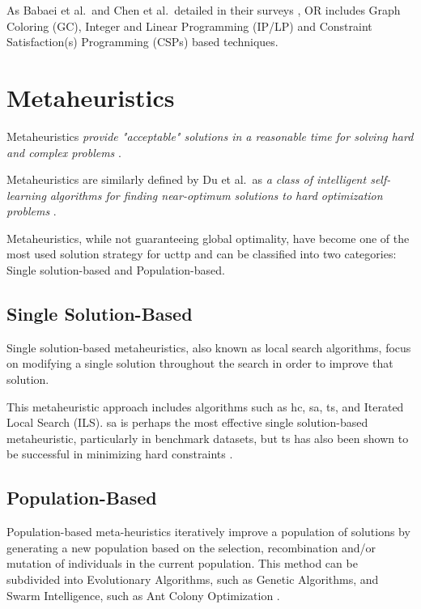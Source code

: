 As Babaei et al.\ and Chen et al.\ detailed in their surveys \cite{babaei_survey_2015,chen_survey_2021}, OR includes Graph Coloring (GC), Integer and Linear Programming (IP/LP) and Constraint Satisfaction(s) Programming (CSPs) based techniques.

\section{Metaheuristics}

Metaheuristics \textit{provide "acceptable" solutions in a reasonable time for solving hard and complex problems} \cite{talbi2009metaheuristics}. 

Metaheuristics are similarly defined by Du et al.\ as \textit{a class of intelligent self-learning algorithms for finding near-optimum solutions to hard optimization problems} \cite{du2016search}.

Metaheuristics, while not guaranteeing global optimality, have become one of the most used solution strategy for \ac{ucttp} and can be classified into two categories: Single solution-based and Population-based.

\subsection{Single Solution-Based}

Single solution-based metaheuristics, also known as local search algorithms, focus on modifying a single solution throughout the search in order to improve that solution. 

This metaheuristic approach includes algorithms such as \ac{hc}, \ac{sa}, \ac{ts}, and Iterated Local Search (ILS). \ac{sa} is perhaps the most effective single solution-based metaheuristic, particularly in benchmark datasets, but \ac{ts} has also been shown to be successful in minimizing hard constraints \cite{abdipoor_meta-heuristic_2023}.

\subsection{Population-Based}

Population-based meta-heuristics iteratively improve a population of solutions by generating a new population based on the selection, recombination and/or mutation of individuals in the current population. This method can be subdivided into Evolutionary Algorithms, such as Genetic Algorithms, and Swarm Intelligence, such as Ant Colony Optimization \cite{abdipoor_meta-heuristic_2023,du2016search}.


